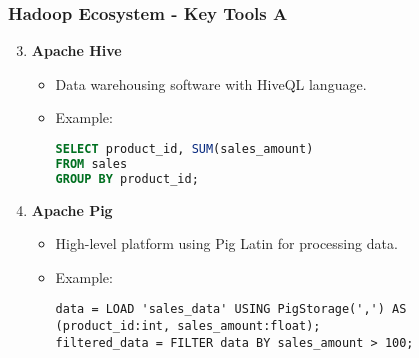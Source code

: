 \documentclass{beamer}
\begin{document}
\begin{frame}[fragile]
    \frametitle{Hadoop Ecosystem - Key Tools A}
    \begin{enumerate}
        \setcounter{enumi}{2}
        \item \textbf{Apache Hive}
            \begin{itemize}
                \item Data warehousing software with HiveQL language.
                \item Example:
                \begin{lstlisting}[language=SQL]
SELECT product_id, SUM(sales_amount)
FROM sales
GROUP BY product_id;
                \end{lstlisting}
            \end{itemize}
        \item \textbf{Apache Pig}
            \begin{itemize}
                \item High-level platform using Pig Latin for processing data.
                \item Example:
                \begin{lstlisting}[language=Pig]
data = LOAD 'sales_data' USING PigStorage(',') AS (product_id:int, sales_amount:float);
filtered_data = FILTER data BY sales_amount > 100;
                \end{lstlisting}
            \end{itemize}
    \end{enumerate}
\end{frame}
\end{document}
